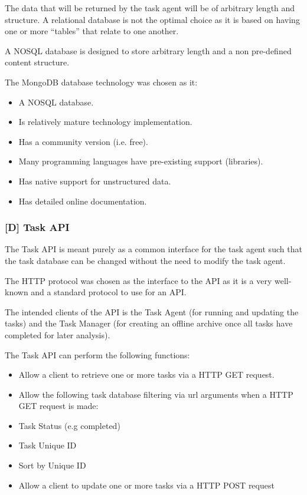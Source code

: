 \documentclass{mscreport}
\begin{document}
\vspace{0.3cm} \noindent
The data that will be returned by the task agent will be of arbitrary length and structure. A relational database is not the optimal choice as it is based on having one or more ``tables'' that relate to one another.

\vspace{0.3cm} \noindent
A NOSQL database is designed to store arbitrary length and a non pre-defined content structure.

\vspace{0.3cm} \noindent
The MongoDB database technology was chosen as it:

\begin{itemize}
	\setlength\itemsep{0.1em}
    \item A NOSQL database.
    \item Is relatively mature technology implementation.
    \item Has a community version (i.e. free).
    \item Many programming languages have pre-existing support (libraries).
    \item Has native support for unstructured data.
    \item Has detailed online documentation.
\end{itemize}

\subsubsection{[D] Task API}

The Task API is meant purely as a common interface for the task agent such that the task database can be changed without the need to modify the task agent.

\vspace{0.3cm} \noindent
The HTTP protocol was chosen as the interface to the API as it is a very well-known and a standard protocol to use for an API.

\vspace{0.3cm} \noindent
The intended clients of the API is the Task Agent (for running and updating the tasks) and the Task Manager (for creating an offline archive once all tasks have completed for later analysis).

\vspace{0.3cm} \noindent
The Task API can perform the following functions:

\begin{itemize}
	\setlength\itemsep{0.1em}
    \item Allow a client to retrieve one or more tasks via a HTTP GET request.
    \item Allow the following task database filtering via url arguments when a HTTP GET request is made:
    \item Task Status (e.g completed)
    \item Task Unique ID
    \item Sort by Unique ID
    \item Allow a client to update one or more tasks via a HTTP POST request
\end{itemize}
\end{document}
